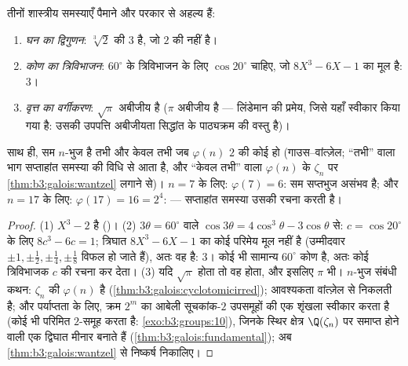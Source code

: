\begin{corollary}\label{cor:b3:galois:impossible}
तीनों शास्त्रीय समस्याएँ पैमाने और परकार से अहल्य हैं:
\begin{enumerate}
  \item \emph{घन का द्विगुणन}: $\sqrt[3]2$ की  $3$ है, जो $2$
        की  नहीं है।
  \item \emph{कोण का त्रिविभाजन}: $60^\circ$ के त्रिविभाजन के लिए
        $\cos 20^\circ$ चाहिए, जो  $8X^3
        - 6X - 1$ का मूल है:  $3$।
  \item \emph{वृत्त का वर्गीकरण}: $\sqrt\pi$ अबीजीय है ($\pi$ अबीजीय
        है --- लिंडेमान की प्रमेय, जिसे यहाँ स्वीकार किया गया
        है: उसकी उपपत्ति अबीजीयता सिद्धांत के पाठ्यक्रम की वस्तु
        है)।
\end{enumerate}
साथ ही, सम $n$-भुज  है तभी और केवल तभी जब $\varphi(n)$ $2$ की
कोई  हो (गाउस--वांत्ज़ेल; ``तभी'' वाला भाग सप्ताहांत समस्या
की विधि से आता है, और ``केवल तभी'' वाला  $\varphi(n)$ के $\zeta_n$ पर
\cref{thm:b3:galois:wantzel} लगाने से)। $n = 7$ के लिए: $\varphi(7) = 6$: सम सप्तभुज असंभव है; और
$n = 17$ के लिए: $\varphi(17) = 16 = 2^4$:  --- सप्ताहांत समस्या उसकी रचना करती
है।
\end{corollary}

\begin{proof}
(1) $X^3 - 2$  है ()। (2) $3\theta =
60^\circ$ वाले $\cos
3\theta = 4\cos^3\theta - 3\cos\theta$ से:
$c = \cos 20^\circ$ के लिए $8c^3 - 6c = 1$; त्रिघात $8X^3 - 6X - 1$ का कोई परिमेय मूल नहीं है
(उम्मीदवार $\pm1, \pm\frac
12, \pm\frac14, \pm\frac18$ विफल हो जाते हैं), अतः वह  है: 
$3$। कोई भी सामान्य $60^\circ$ कोण  है, अतः कोई त्रिविभाजक
$c$ की रचना कर देता। (3) यदि $\sqrt\pi$  होता तो वह 
होता, और इसलिए $\pi$ भी। $n$-भुज संबंधी कथन: $\zeta_n$ की 
$\varphi(n)$ है (\cref{thm:b3:galois:cyclotomicirred}); आवश्यकता वांत्ज़ेल से निकलती है; और
पर्याप्तता के लिए, क्रम $2^m$ का आबेली  सूचकांक-$2$
उपसमूहों की एक शृंखला स्वीकार करता है (कोई भी परिमित $2$-समूह
करता है: \cref{exo:b3:groups:10}), जिनके स्थिर क्षेत्र $\Q(\zeta_n)$ पर समाप्त होने वाली
एक द्विघात मीनार बनाते हैं (\cref{thm:b3:galois:fundamental}); अब \cref{thm:b3:galois:wantzel} से निष्कर्ष
निकालिए।
\end{proof}

